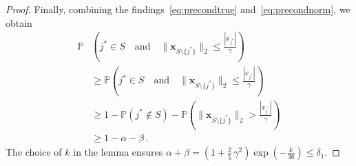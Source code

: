 \documentclass[10pt,a4paper]{amsart}
\renewcommand{\P}{{\mathbb P}}
\renewcommand{\vec}{\boldsymbol}
\begin{document}
\begin{proof}
    Finally, combining the findings~\eqref{eq:precondtrue} and~\eqref{eq:precondnorm}, we obtain
    \begin{align*}
        \P&\left( j^\ast \in S \quad \text{and} \quad
            \|\vec{x}_{S \setminus\{j^\ast\}}\|_2 \leq \frac{|x_{j^\ast}|}{\gamma}
            \right) \\
            &\geq \P\left( j^\ast \in S \quad \text{and} \quad
            \|\vec{x}_{\overline{S} \setminus\{j^\ast\}}\|_2 \leq \frac{|x_{j^\ast}|}{\gamma}
            \right) \\
            &\geq 1 - \P\left( j^\ast \notin S\right)
                    - \P\left(\|\vec{x}_{\overline{S} \setminus\{j^\ast\}}\|_2 > \frac{|x_{j^\ast}|}{\gamma}\right) \\
            &\geq 1 - \alpha - \beta \,.
    \end{align*}
    The choice of $k$ in the lemma ensures
    $\alpha + \beta = \left(1 + \frac{2}{5} \, \gamma^2\right) \exp\left(-\frac{k}{36}\right) \leq \delta_1$.
\end{proof}
\end{document}
